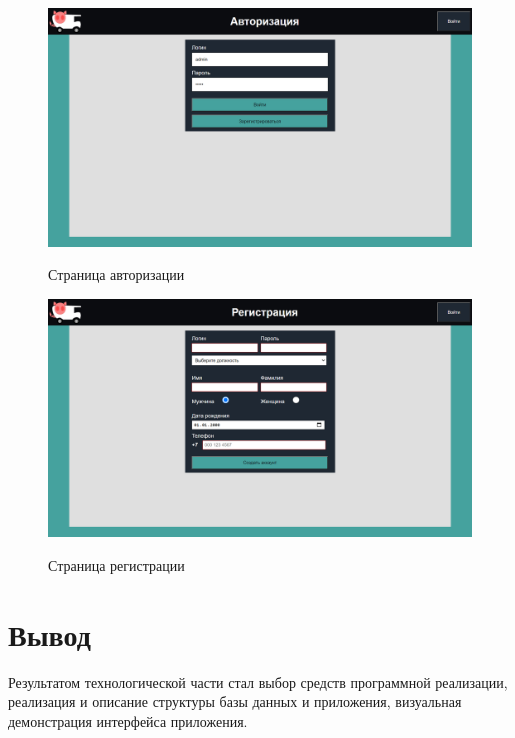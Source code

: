 \begin{figure}[h!] \label{login_sc}
	\begin{center}
		{\includegraphics[scale=0.38, angle=0]{sc/login}}
		\caption{Страница авторизации}
	\end{center}
\end{figure}

\begin{figure}[h!] \label{signup_sc}
	\begin{center}
		{\includegraphics[scale=0.38, angle=0]{sc/signup}}
		\caption{Страница регистрации}
	\end{center}
\end{figure}


\section*{Вывод}
Результатом технологической части стал выбор средств программной реализации, реализация и описание структуры базы данных и приложения, визуальная демонстрация интерфейса приложения.
